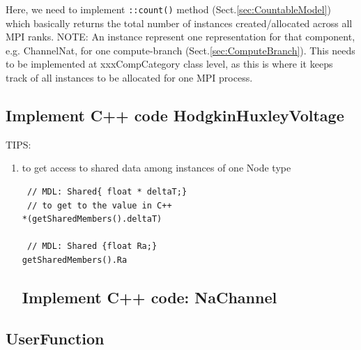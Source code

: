 Here, we need to implement \verb!::count()! method
(Sect.\ref{sec:CountableModel}) which basically returns the total number of
instances created/allocated across all MPI ranks. NOTE: An instance represent
one representation for that component, e.g. ChannelNat, for one compute-branch
(Sect.\ref{sec:ComputeBranch}).
This needs to be implemented at xxxCompCategory class level, as this is where it
keeps track of all instances to be allocated for one MPI process.


\subsection{Implement C++ code HodgkinHuxleyVoltage}
\label{sec:HodgkinHuxleyVoltage-C++-code}

TIPS:
\begin{enumerate}
  \item to get access to shared data among instances of one Node type
  
\begin{verbatim}
 // MDL: Shared{ float * deltaT;}
 // to get to the value in C++
*(getSharedMembers().deltaT)

 // MDL: Shared {float Ra;}
getSharedMembers().Ra
\end{verbatim}  
  
  
\subsection{Implement C++ code: NaChannel}
\end{enumerate}


\subsection{UserFunction}
\label{sec:UserFunction}


